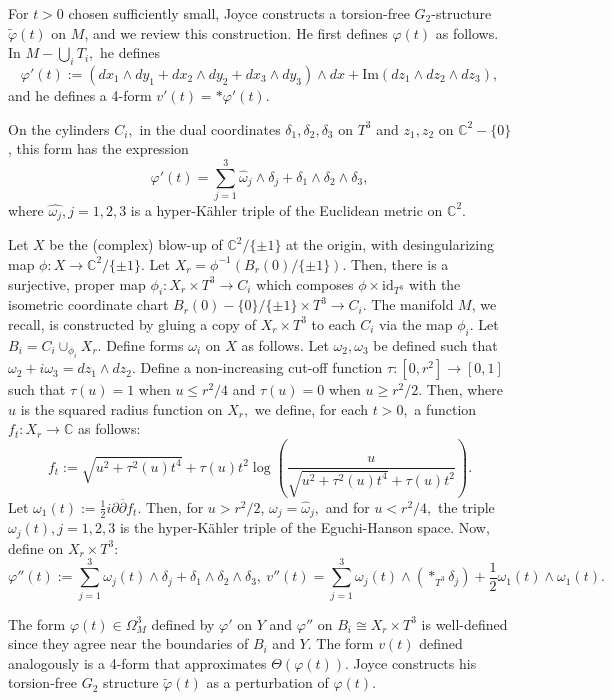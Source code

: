 \documentclass{amsart}
\theoremstyle{theorem}
\theoremstyle{definition}
\theoremstyle{definition}
\theoremstyle{definition}
\theoremstyle{theorem}
\theoremstyle{theorem}
\theoremstyle{theorem}
\theoremstyle{corollary}
\theoremstyle{question}
\theoremstyle{remark}
\begin{document}
For $t>0$ chosen sufficiently small, Joyce constructs a torsion-free $G_2$-structure $\widetilde\varphi(t)$ on $M$, and we review this construction. He first defines $\varphi(t)$ as follows. In $M - \bigcup_i T_i,$ he defines $$\varphi'(t) := (dx_1\wedge dy_1+dx_2\wedge dy_2+dx_3\wedge dy_3)\wedge dx+\text{Im}(dz_1\wedge dz_2\wedge dz_3),$$ and he defines a 4-form $v'(t) = *\varphi'(t).$ 

On the cylinders $C_i,$ in the dual coordinates $\delta_1, \delta_2, \delta_3$ on $T^3$ and $z_1, z_2$ on $\mathbb{C}^2 - \{0\}$, this form has the expression $$\varphi'(t) = \sum_{j=1}^3\hat\omega_j\wedge\delta_j + \delta_1\wedge\delta_2\wedge\delta_3,$$ where $\hat{\omega_j}, j=1,2,3$ is a hyper-K\"ahler triple of the Euclidean metric on $\mathbb{C}^2.$

Let $X$ be the (complex) blow-up of $\mathbb{C}^2/\{\pm 1\}$ at the origin, with desingularizing map $\phi:X\to \mathbb{C}^2/\{\pm 1\}.$ Let $X_r = \phi^{-1}(B_r(0)/\{\pm1\}).$ Then, there is a surjective, proper map $\phi_i:X_r\times T^3\to C_i$ which composes $\phi\times \text{id}_{T^3}$ with the isometric coordinate chart $B_r(0)-\{0\}/\{\pm1\}\times T^3\to C_i.$ The manifold $M$, we recall, is constructed by gluing a copy of $X_r\times T^3$ to each $C_i$ via the map $\phi_i.$ Let $B_i = C_i\cup_{\phi_i} X_r.$ Define forms $\omega_i$ on $X$ as follows. Let $\omega_2, \omega_3$ be defined such that $\omega_2+i\omega_3 = dz_1\wedge dz_2$. Define a non-increasing cut-off function $\tau:[0,r^2]\to [0,1]$ such that $\tau(u) = 1$ when $u\leq r^2/4$ and $\tau(u) = 0$ when $u\geq r^2/2.$ Then, where $u$ is the squared radius function on $X_r,$ we define, for each $t>0,$ a function $f_t:X_r\to\mathbb{C}$ as follows: $$f_t := \sqrt{u^2+\tau^2(u)t^4} + \tau(u)t^2\log\left(\frac{u}{\sqrt{u^2+\tau^2(u)t^4}+\tau(u)t^2}\right).$$ Let $\omega_1(t) := \frac12 i\partial\overline{\partial}f_t.$ Then, for $u>r^2/2$, $\omega_j =\hat\omega_j,$ and for $u<r^2/4,$ the triple $\omega_j(t), j=1,2,3$ is the hyper-K\"ahler triple of the Eguchi-Hanson space. Now, define on $X_r\times T^3$: $$\varphi''(t) := \sum_{j=1}^3\omega_j(t)\wedge\delta_j + \delta_1\wedge\delta_2\wedge\delta_3, ~ v''(t) = \sum_{j=1}^3\omega_j(t)\wedge(*_{T^3}\delta_j)+\frac12 \omega_1(t)\wedge\omega_1(t).$$

The form $\varphi(t)\in\Omega^3_M$ defined by $\varphi'$ on $Y$ and $\varphi''$ on $B_i\cong X_r\times T^3$ is well-defined since they agree near the boundaries of $B_i$ and $Y.$ The form $v(t)$ defined analogously is a 4-form that approximates $\Theta(\varphi(t)).$ Joyce constructs his torsion-free $G_2$ structure $\widetilde\varphi(t)$ as a perturbation of $\varphi(t)$.
\end{document}
